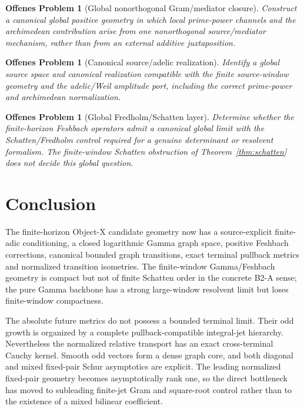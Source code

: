 \documentclass[11pt,a4paper]{amsart}
\newtheorem{openproblem}[theorem]{Offenes Problem}
\begin{document}
\begin{openproblem}[Global nonorthogonal Gram/mediator closure]\label{open:gram}
Construct a canonical global positive geometry in which local prime-power channels and
the archimedean contribution arise from one nonorthogonal source/mediator mechanism,
rather than from an external additive juxtaposition.
\end{openproblem}

\begin{openproblem}[Canonical source/adelic realization]\label{open:adelic}
Identify a global source space and canonical realization compatible with the finite
source-window geometry and the adelic/Weil amplitude port, including the correct
prime-power and archimedean normalization.
\end{openproblem}

\begin{openproblem}[Global Fredholm/Schatten layer]\label{open:fredholm}
Determine whether the finite-horizon Feshbach operators admit a canonical global limit
with the Schatten/Fredholm control required for a genuine determinant or resolvent
formalism.  The finite-window Schatten obstruction of Theorem~\ref{thm:schatten} does
not decide this global question.
\end{openproblem}

\section{Conclusion}\label{sec:conclusion}

The finite-horizon Object-X candidate geometry now has a source-explicit finite-adic
conditioning, a closed logarithmic Gamma graph space, positive Feshbach corrections,
canonical bounded graph transitions, exact terminal pullback metrics and normalized
transition isometries.  The finite-window Gamma/Feshbach geometry is compact but not of
finite Schatten order in the concrete B2-A sense; the pure Gamma backbone has a strong
large-window resolvent limit but loses finite-window compactness.

The absolute future metrics do not possess a bounded terminal limit.  Their odd growth
is organized by a complete pullback-compatible integral-jet hierarchy.  Nevertheless
the normalized relative transport has an exact cross-terminal Cauchy kernel.  Smooth odd
vectors form a dense graph core, and both diagonal and mixed fixed-pair Schur asymptotics
are explicit.  The leading normalized fixed-pair geometry becomes asymptotically rank
one, so the direct bottleneck has moved to subleading finite-jet Gram and square-root
control rather than to the existence of a mixed bilinear coefficient.
\end{document}

